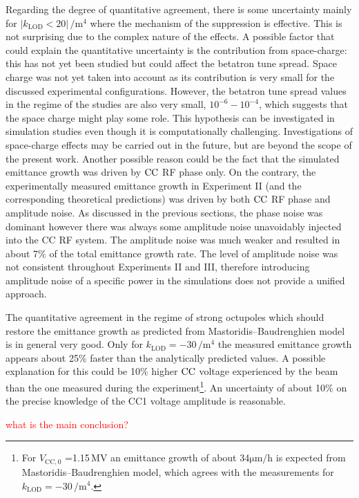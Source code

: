 Regarding the degree of quantitative agreement, there is some uncertainty mainly for $| k_\mathrm{LOD} < 20|$\,$\mathrm{/m^4}$ where the mechanism of the suppression is effective. This is not surprising due to the complex nature of the effects. A possible factor that could explain the quantitative uncertainty is the contribution from space-charge: this has not yet been studied but could affect the betatron tune spread. Space charge was not yet taken into account as its contribution is very small for the discussed experimental configurations. However, the betatron tune spread values in the regime of the studies are also very small, $10^{-6}-10^{-4}$, which suggests that the space charge might play some role. This hypothesis can be investigated in simulation studies even though it is computationally challenging. Investigations of space-charge effects may be carried out in the future, but are beyond the scope of the present work. Another possible reason could be the fact that the simulated emittance growth was driven by ${\mathrm{CC}}$ RF phase only. On the contrary, the experimentally measured emittance growth in Experiment II (and the corresponding theoretical predictions) was driven by both ${\mathrm{CC}}$ RF phase and amplitude noise. As discussed in the previous sections, the phase noise was dominant however there was always some amplitude noise unavoidably injected into the CC RF system. The amplitude noise was much weaker and resulted in about 7$\%$ of the total emittance growth rate. The level of amplitude noise was not consistent throughout Experiments II and III, therefore introducing amplitude noise of a specific power in the simulations does not provide a unified approach. 


The quantitative agreement in the regime of strong octupoles which should restore the emittance growth as predicted from Mastoridis--Baudrenghien model is in general very good. Only for $k_\mathrm{LOD} =-30$\,$\mathrm{/m^4}$ the measured emittance growth appears about 25$\%$ faster than the analytically predicted values. A possible explanation for this could be 10$\%$ higher ${\mathrm{CC}}$ voltage experienced by the beam than the one measured during the experiment\footnote{For $V_\mathrm{CC,0}$ =1.15\,MV an emittance growth of about 34$\mathrm{\mu m/h}$ is expected from Mastoridis--Baudrenghien model, which agrees with the measurements for $k_\mathrm{LOD} =-30$\,$\mathrm{/m^4}$.}. An uncertainty of about 10$\%$ on the precise knowledge of the CC1 voltage amplitude is reasonable. 


\textcolor{red}{what is the main conclusion?}

